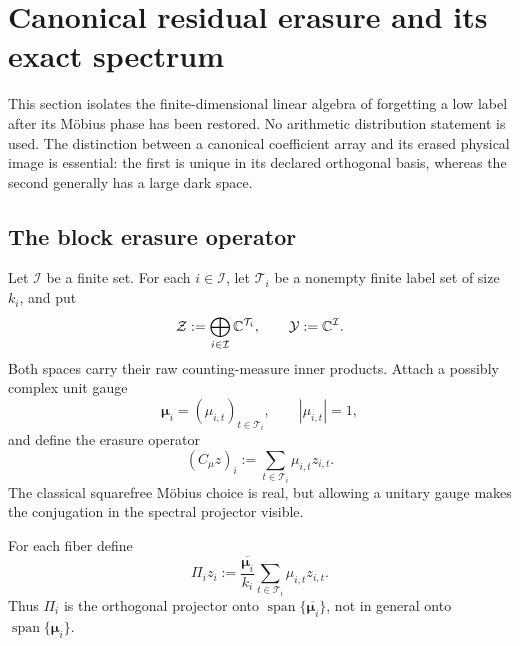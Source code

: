 \section{Canonical residual erasure and its exact spectrum}
\label{sec:tpc58-erasure-spectrum}

This section isolates the finite-dimensional linear algebra of forgetting a
low label after its M\"obius phase has been restored.  No arithmetic
distribution statement is used.  The distinction between a canonical
coefficient array and its erased physical image is essential: the first is
unique in its declared orthogonal basis, whereas the second generally has a
large dark space.

\subsection{The block erasure operator}

Let \(\mathcal I\) be a finite set.  For each \(i\in\mathcal I\), let
\(\mathcal T_i\) be a nonempty finite label set of size \(k_i\), and put
\begin{equation}
 \mathcal Z:=\bigoplus_{i\in\mathcal I}\mathbb C^{\mathcal T_i},
 \qquad
 \mathcal Y:=\mathbb C^{\mathcal I}.
 \label{eq:tpc58-erasure-spaces}
\end{equation}
Both spaces carry their raw counting-measure inner products.  Attach a
possibly complex unit gauge
\begin{equation}
 \bm\mu_i=(\mu_{i,t})_{t\in\mathcal T_i},
 \qquad |\mu_{i,t}|=1,
 \label{eq:tpc58-unit-mobius-gauge}
\end{equation}
and define the erasure operator
\begin{equation}
 (C_\mu z)_i:=\sum_{t\in\mathcal T_i}\mu_{i,t}z_{i,t}.
 \label{eq:tpc58-erasure-operator}
\end{equation}
The classical squarefree M\"obius choice is real, but allowing a unitary
gauge makes the conjugation in the spectral projector visible.

For each fiber define
\begin{equation}
 \Pi_i z_i
 :=\frac{\overline{\bm\mu_i}}{k_i}
       \sum_{t\in\mathcal T_i}\mu_{i,t}z_{i,t}.
 \label{eq:tpc58-bright-projector}
\end{equation}
Thus \(\Pi_i\) is the orthogonal projector onto
\(\operatorname{span}\{\overline{\bm\mu_i}\}\), not in general onto
\(\operatorname{span}\{\bm\mu_i\}\).

